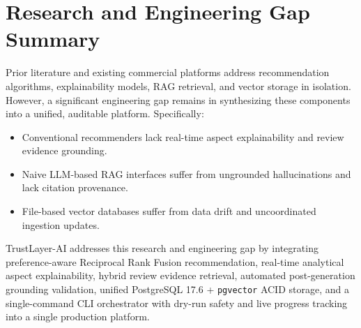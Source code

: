 \section{Research and Engineering Gap Summary}
Prior literature and existing commercial platforms address recommendation algorithms, explainability models, RAG retrieval, and vector storage in isolation. However, a significant engineering gap remains in synthesizing these components into a unified, auditable platform. Specifically:
\begin{itemize}
    \item Conventional recommenders lack real-time aspect explainability and review evidence grounding.
    \item Naive LLM-based RAG interfaces suffer from ungrounded hallucinations and lack citation provenance.
    \item File-based vector databases suffer from data drift and uncoordinated ingestion updates.
\end{itemize}

TrustLayer-AI addresses this research and engineering gap by integrating preference-aware Reciprocal Rank Fusion recommendation, real-time analytical aspect explainability, hybrid review evidence retrieval, automated post-generation grounding validation, unified PostgreSQL 17.6 + \texttt{pgvector} ACID storage, and a single-command CLI orchestrator with dry-run safety and live progress tracking into a single production platform.
